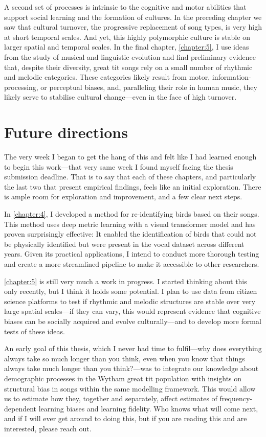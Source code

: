 A second set of processes is intrinsic to the cognitive and motor abilities that support social learning and the formation of cultures. In the preceding chapter we saw that cultural turnover, the progressive replacement of song types, is very high at short temporal scales. And yet, this highly polymorphic culture is stable on larger spatial and temporal scales. In the final chapter, \autoref{chapter:5}, I use ideas from the study of musical and linguistic evolution and find preliminary evidence that, despite their diversity, great tit songs rely on a small number of rhythmic and melodic categories. These categories likely result from motor, information-processing, or perceptual biases, and, paralleling their role in human music, they likely serve to stabilise cultural change---even in the face of high turnover.

\section{Future directions}
The very week I began to get the hang of this and felt like I had learned enough to begin this work---that very same week I found myself facing the thesis submission deadline. That is to say that each of these chapters, and particularly the last two that present empirical findings, feels like an initial exploration. There is ample room for exploration and improvement, and a few clear next steps.

In \autoref{chapter:4}, I developed a method for re-identifying birds based on their songs. This method uses deep metric learning with a visual transformer model and has proven surprisingly effective: It enabled the identification of birds that could not be physically identified but were present in the vocal dataset across different years. Given its practical applications, I intend to conduct more thorough testing and create a more streamlined pipeline to make it accessible to other researchers.

\autoref{chapter:5} is still very much a work in progress. I started thinking about this only recently, but I think it holds some potential. I plan to use data from citizen science platforms to test if rhythmic and melodic structures are stable over very large spatial scales---if they can vary, this would represent evidence that cognitive biases can be socially acquired and evolve culturally---and to develop more formal tests of these ideas.

An early goal of this thesis, which I never had time to fulfil---why does everything always take so much longer than you think, even when you know that things always take much longer than you think?---was to integrate our knowledge about demographic processes in the Wytham great tit population with insights on structural bias in songs within the same modelling framework. This would allow us to estimate how they, together and separately, affect estimates of frequency-dependent learning biases and learning fidelity. Who knows what will come next, and if I will ever get around to doing this, but if you are reading this and are interested, please reach out.\\

\centering
\hspace{-.23cm}
\centering




